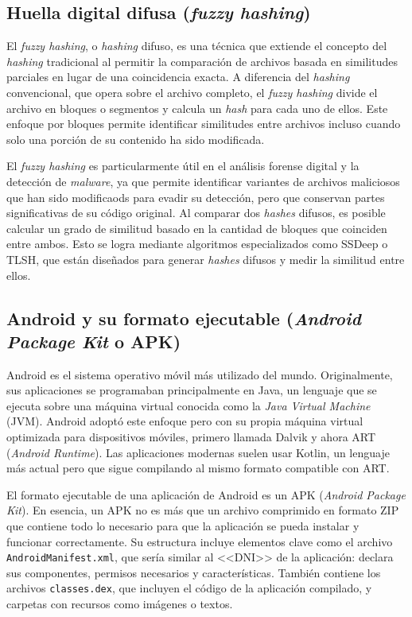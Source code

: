 \subsection{Huella digital difusa (\textit{fuzzy hashing})}

El \textit{fuzzy hashing}, o \textit{hashing} difuso, es una técnica que extiende el concepto del \textit{hashing} tradicional al permitir la comparación de archivos basada en similitudes parciales en lugar de una coincidencia exacta. A diferencia del \textit{hashing} convencional, que opera sobre el archivo completo, el \textit{fuzzy hashing} divide el archivo en bloques o segmentos y calcula un \textit{hash} para cada uno de ellos. Este enfoque por bloques permite identificar similitudes entre archivos incluso cuando solo una porción de su contenido ha sido modificada.

El \textit{fuzzy hashing} es particularmente útil en el análisis forense digital y la detección de \textit{malware}, ya que permite identificar variantes de archivos maliciosos que han sido modificaods para evadir su detección, pero que conservan partes significativas de su código original. Al comparar dos \textit{hashes} difusos, es posible calcular un grado de similitud basado en la cantidad de bloques que coinciden entre ambos. Esto se logra mediante algoritmos especializados como SSDeep o TLSH, que están diseñados para generar \textit{hashes} difusos y medir la similitud entre ellos.

\subsection{Android y su formato ejecutable (\textit{Android Package Kit} o APK)}

Android es el sistema operativo móvil más utilizado del mundo. Originalmente, sus aplicaciones se programaban principalmente en Java, un lenguaje que se ejecuta sobre una máquina virtual conocida como la \textit{Java Virtual Machine} (JVM). Android adoptó este enfoque pero con su propia máquina virtual optimizada para dispositivos móviles, primero llamada Dalvik y ahora ART (\textit{Android Runtime}). Las aplicaciones modernas suelen usar Kotlin, un lenguaje más actual pero que sigue compilando al mismo formato compatible con ART.

El formato ejecutable de una aplicación de Android es un APK (\textit{Android Package Kit}). En esencia, un APK no es más que un archivo comprimido en formato ZIP que contiene todo lo necesario para que la aplicación se pueda instalar y funcionar correctamente. Su estructura incluye elementos clave como el archivo \texttt{AndroidManifest.xml}, que sería similar al <<DNI>> de la aplicación: declara sus componentes, permisos necesarios y características. También contiene los archivos \texttt{classes.dex}, que incluyen el código de la aplicación compilado, y carpetas con recursos como imágenes o textos.

